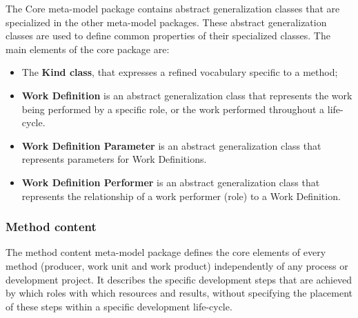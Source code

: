 The Core meta-model package contains abstract generalization classes that are specialized in the other meta-model packages. These abstract generalization classes are used to define
common properties of their specialized classes. The main elements of the core package are:
\begin{itemize}
\item The \textbf{Kind class}, that expresses a refined vocabulary specific to a method;
\item \textbf{Work Definition} is an abstract generalization class that represents the work being performed by a specific role, or the work performed throughout a life-cycle.
\item \textbf{Work Definition Parameter} is an abstract generalization class that represents parameters for Work Definitions.
\item \textbf{Work Definition Performer} is an abstract generalization class that represents the relationship of a work performer (role) to a Work Definition.
\end{itemize}

\subsubsection{Method content}

The method content meta-model package defines the core elements of every method (producer, work unit and work product) independently of any process or development project. It describes the specific development steps that are achieved by which roles with which resources and results, without specifying the placement of these steps within a specific development life-cycle.


